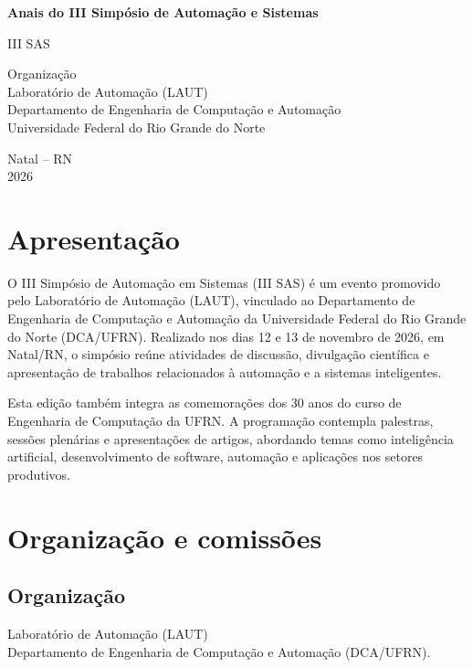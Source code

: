 \documentclass[12pt,a4paper,oneside,openany]{book}
\begin{document}
\frontmatter
\begin{titlepage}
  \centering
  \vspace*{2cm}
  {\Large\bfseries Anais do III Simpósio de Automação e Sistemas\par}
  \vspace{0.5cm}
  {\large III SAS\par}
  \vfill
  {\large Organização\\Laboratório de Automação (LAUT) \\ Departamento de Engenharia de Computação e Automação\\Universidade Federal do Rio Grande do Norte\par}
  \vfill
  {\large Natal -- RN\\2026\par}
\end{titlepage}

\chapter*{Apresentação}

O III Simpósio de Automação em Sistemas (III SAS) é um evento promovido pelo
Laboratório de Automação (LAUT), vinculado ao Departamento de Engenharia de
Computação e Automação da Universidade Federal do Rio Grande do Norte
(DCA/UFRN). Realizado nos dias 12 e 13 de novembro de 2026, em Natal/RN, o
simpósio reúne atividades de discussão, divulgação científica e apresentação
de trabalhos relacionados à automação e a sistemas inteligentes.

Esta edição também integra as comemorações dos 30 anos do curso de Engenharia
de Computação da UFRN. A programação contempla palestras, sessões plenárias e
apresentações de artigos, abordando temas como inteligência artificial,
desenvolvimento de software, automação e aplicações nos setores produtivos.

\chapter*{Organização e comissões}

\section*{Organização}
Laboratório de Automação (LAUT) \\ Departamento de Engenharia de Computação e
Automação (DCA/UFRN).
\end{document}
